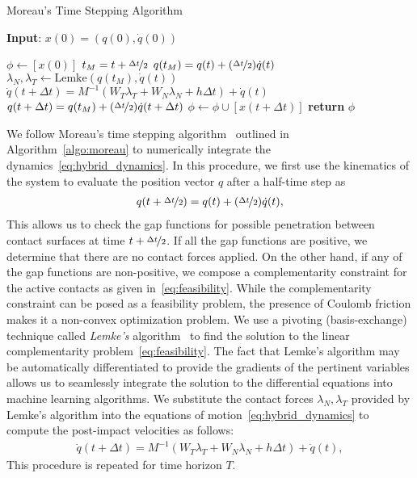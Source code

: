 %
\begin{algorithm}[tb]
    \caption{Moreau's Time Stepping Algorithm}
    \label{algo:moreau}
    \small
    \hspace*{\algorithmicindent} \textbf{Input}: $x(0) = (q(0), \dot{q}(0))$
    \begin{algorithmic}[1]
      \State $\phi \leftarrow  [x(0)]$ 
           
            \State $t_M = t + \nicefrac{\Delta t}{2}$
            \State $q(t_M) = q(t) +  (\nicefrac{\Delta t}{2}) \dot{q}(t) $
            \State $\lambda_N, \lambda_T \leftarrow \text{Lemke}(q(t_M), \dot{q}(t))$ 
            \State $\dot{q}(t+\Delta t) = M^{-1}(W_T \lambda_T + W_N \lambda_N + h\Delta t) + \dot{q}(t)$
            \State $q(t + \Delta t) =  q(t_M) +  (\nicefrac{\Delta t}{2})\dot{q}(t+\Delta t)$
            \State $\phi \leftarrow \phi \cup [x(t+\Delta t)]$
          \EndFor
        \State \textbf{return} $\phi$
    \end{algorithmic}
\end{algorithm}
%
We follow Moreau's time stepping algorithm~\cite{glocker2005formulation}
outlined in Algorithm~\eqref{algo:moreau} to numerically integrate the
dynamics~\eqref{eq:hybrid_dynamics}. 
%
In this procedure, we first use the kinematics of the system to evaluate the
position vector $q$ after a half-time step as
\begin{align*}
  q(t+\nicefrac{\Delta t}{2}) = q(t) +  (\nicefrac{\Delta t}{2}) \dot{q}(t), 
\end{align*}
%
This allows us to check the gap functions for possible penetration between
contact surfaces at time $t+\nicefrac{\Delta t}{2}$.
%
If all the gap functions are positive, we determine that there are no
contact forces applied.
%
On the other hand, if any of the gap functions are non-positive, we compose a
complementarity constraint for the active contacts as given
in~\eqref{eq:feasibility}.
%
While the complementarity constraint can be posed as a feasibility problem, the
presence of Coulomb friction makes it a non-convex optimization problem. 
%
We use a pivoting (basis-exchange) technique called \textit{Lemke's}
algorithm~\cite{acary2008numerical} to find the solution to the linear
complementarity problem~\eqref{eq:feasibility}. The fact that Lemke's algorithm
may be automatically differentiated to provide the gradients of the pertinent
variables allows us to seamlessly integrate the solution to the differential
equations into machine learning algorithms.
%
We substitute the contact forces $\lambda_N, \lambda_T$ provided by Lemke's
algorithm into the equations of motion~\eqref{eq:hybrid_dynamics} to compute the
post-impact velocities as follows:
\begin{align*}
  \dot{q}(t+\Delta t) = M^{-1}(W_T \lambda_T + W_N \lambda_N + h\Delta t) + \dot{q}(t),
\end{align*}
%
This procedure is repeated for time horizon $T$.
%

